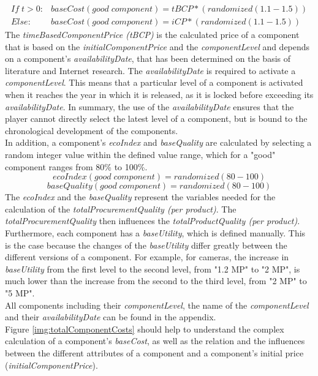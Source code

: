 \begin{equation}
\begin{aligned}
    If \; t > 0: &baseCost(good \; component) = tBCP * (randomized(1.1-1.5))\\
    Else : &baseCost(good \; component) = iCP * (randomized(1.1-1.5))
\end{aligned}    
\end{equation}
The \textit{timeBasedComponentPrice (tBCP)} is the calculated price of a component that is based on the \textit{initialComponentPrice} and the \textit{componentLevel} and depends on a component's \textit{availabilityDate}, that has been determined on the basis of literature and Internet research. The \textit{availabilityDate} is required to activate a \textit{componentLevel}. This means that a particular level of a component is activated when it reaches the year in which it is released, as it is locked before exceeding its \textit{availabilityDate}. In summary, the use of the \textit{availabilityDate} ensures that the player cannot directly select the latest level of a component, but is bound to the chronological development of the components.\\
In addition, a component's \textit{ecoIndex} and \textit{baseQuality} are calculated by selecting a random integer value within the defined value range, which for a "good" component ranges from 80\% to 100\%.
\begin{equation}
    ecoIndex(good \; component) = randomized(80-100)
\end{equation}
\begin{equation}
    baseQuality(good \; component) = randomized(80-100)
\end{equation}
The \textit{ecoIndex} and the \textit{baseQuality} represent the variables needed for the calculation of the \textit{totalProcurementQuality (per product)}. The \textit{totalProcurementQuality} then influences the \textit{totalProductQuality (per product)}.\\
Furthermore, each component has a \textit{baseUtility}, which is defined manually. This is the case because the changes of the \textit{baseUtility} differ greatly between the different versions of a component. For example, for cameras, the increase in \textit{baseUtility} from the first level to the second level, from "1.2 MP" to "2 MP", is much lower than the increase from the second to the third level, from "2 MP" to "5 MP".\\
All components including their \textit{componentLevel}, the name of the \textit{componentLevel} and their \textit{availabilityDate} can be found in the appendix.\\ %
Figure \ref{img:totalComponentCosts} should help to understand the complex calculation of a component's \textit{baseCost}, as well as the relation and the influences between the different attributes of a component and a component’s initial price (\textit{initialComponentPrice}).\\

